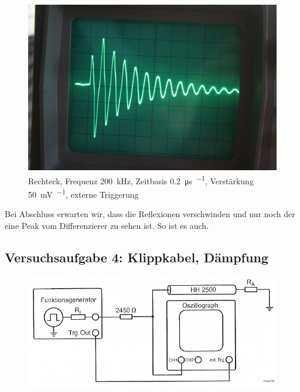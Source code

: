 \begin{figure}
	\centering
	\begin{minipage}{.45\linewidth}
	\end{minipage}
	\hfill
	\begin{minipage}{.45\linewidth}
	\includegraphics[width=\linewidth]{Fotos/IMG_0772-1500.jpg}
	\end{minipage}
	\caption{%
		Rechteck, Frequenz \SI{200}{\kilo\hertz},
		Zeitbasis \SI{.2}{\micro\second\per\division},
		Verstärkung \SI{50}{\milli\volt\per\division},
		externe Triggerung
	}
	\label{fig:0772}
\end{figure}

Bei Abschluss erwarten wir, dass die Reflexionen verschwinden und nur noch der
eine Peak vom Differenzierer zu sehen ist. So ist es auch.

\FloatBarrier
\subsection{Versuchsaufgabe 4: Klippkabel, Dämpfung}

\begin{figure}
	\centering
	\includegraphics[width=\textwidth]{Schaltplan/1-9.png}
	\caption{%
		\cite[Abbildung~1.9]{physik313-Anleitung}
	}
	\label{fig:1-9}
\end{figure}

